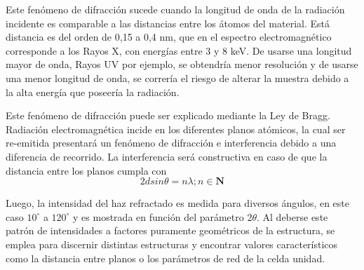 \documentclass[12pt]{article}
\theoremstyle{definition}
\theoremstyle{remark}
\begin{document}
\begin{figure}[H]
\centering
{}
\end{figure}
 
 Este fenómeno de difracción sucede cuando la longitud de onda de la radiación incidente es comparable a las distancias entre los átomos del material. Está distancia es del orden de 0,15 a 0,4 nm, que en el espectro electromagnético corresponde a los Rayos X, con energías entre 3 y 8 keV. De usarse una longitud mayor de onda, Rayos UV por ejemplo, se obtendría menor resolución y de usarse una menor longitud de onda, se correría el riesgo de alterar la muestra debido a la alta energía que poseería la radiación.
 
 
 Este fenómeno de difracción puede ser explicado mediante la Ley de Bragg. Radiación electromagnética incide en los diferentes planos atómicos, la cual ser re-emitida presentará un fenómeno de difracción e interferencia debido a una diferencia de recorrido. La interferencia será constructiva en caso de que la distancia entre los planos cumpla con
 \begin{equation}
 2d sin \theta =n \lambda; n \in \mathbf{N}
 \end{equation}
 
 
 Luego, la intensidad del haz refractado es medida para diversos ángulos, en este caso $10^{\circ}$ a $120^{\circ}$ y es mostrada en función del parámetro $2\theta$. Al deberse este patrón de intensidades  a factores puramente geométricos de la estructura, se emplea para discernir distintas estructuras y encontrar valores característicos como la distancia entre planos o los parámetros de red de la celda unidad.
\end{document}
